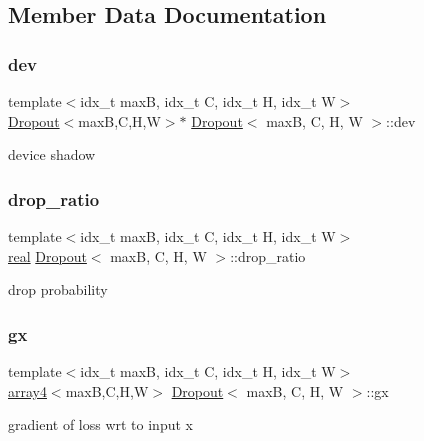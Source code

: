 \subsection{Member Data Documentation}
\mbox{\label{structDropout_a2ce2e6920dfb911f679af91ff9b6de55}} 
\subsubsection{\texorpdfstring{dev}{dev}}
{\footnotesize\ttfamily template$<$idx\+\_\+t maxB, idx\+\_\+t C, idx\+\_\+t H, idx\+\_\+t W$>$ \\
\hyperlink{structDropout}{Dropout}$<$maxB,C,H,W$>$$\ast$ \hyperlink{structDropout}{Dropout}$<$ maxB, C, H, W $>$\+::dev}

device shadow \mbox{\label{structDropout_a4181a1bcb986c62b1c6a82a3c1e03d9f}} 
\subsubsection{\texorpdfstring{drop\+\_\+ratio}{drop\_ratio}}
{\footnotesize\ttfamily template$<$idx\+\_\+t maxB, idx\+\_\+t C, idx\+\_\+t H, idx\+\_\+t W$>$ \\
\hyperlink{vgg__util_8h_a1082d08aaa761215ec83e7149f27ad16}{real} \hyperlink{structDropout}{Dropout}$<$ maxB, C, H, W $>$\+::drop\+\_\+ratio}

drop probability \mbox{\label{structDropout_a1cf5aced88d251c6b49772ad318bbd27}} 
\subsubsection{\texorpdfstring{gx}{gx}}
{\footnotesize\ttfamily template$<$idx\+\_\+t maxB, idx\+\_\+t C, idx\+\_\+t H, idx\+\_\+t W$>$ \\
\hyperlink{structarray4}{array4}$<$maxB,C,H,W$>$ \hyperlink{structDropout}{Dropout}$<$ maxB, C, H, W $>$\+::gx}

gradient of loss wrt to input x \mbox{\label{structDropout_a55a275be949499a6f3f27fcb9989964e}} 

